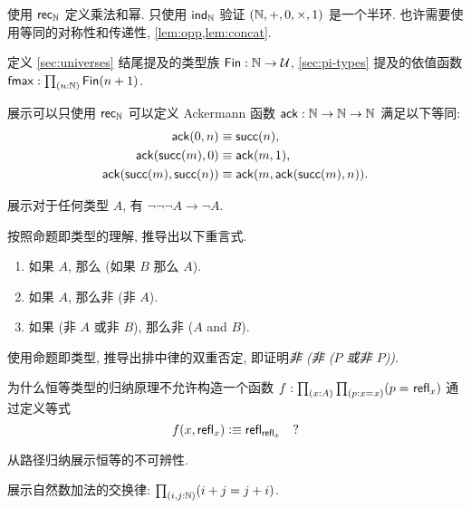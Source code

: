 \begin{ex}
    \label{ex:nat-semiring}
    使用 $\mathsf{rec}_{\mathbb{N}}$ 定义乘法和幂.
    只使用 $\mathsf{ind}_{\mathbb{N}}$ 验证 $(\mathbb{N},+,0,\times,1)$ 是一个半环.
    也许需要使用等同的对称性和传递性, \cref{lem:opp,lem:concat}.
\end{ex}

\begin{ex}
    \label{ex:fin}
    定义 \cref{sec:universes} 结尾提及的类型族 $\mathsf{Fin} : \mathbb{N} \to \mathcal{U}$, \cref{sec:pi-types} 提及的依值函数 $\fmax : \prd{n:\nat} \Fin(n+1)$.
\end{ex}

\begin{ex}
    \label{ex:ackermann}
    展示可以只使用 $\mathsf{rec}_{\mathbb{N}}$ 可以定义 Ackermann 函数 $\mathsf{ack} : \mathbb{N} \to \mathbb{N} \to \mathbb{N}$ 满足以下等同:
    \begin{align*}
        \mathsf{ack}(0,n) &\equiv \mathsf{succ}(n), \\
        \mathsf{ack}(\mathsf{succ}(m),0) &\equiv \mathsf{ack}(m,1), \\
        \mathsf{ack}(\mathsf{succ}(m),\mathsf{succ}(n)) &\equiv \mathsf{ack}(m,\mathsf{ack}(\mathsf{succ}(m),n)).
    \end{align*}
\end{ex}

\begin{ex}
    \label{ex:neg-ldn}
    展示对于任何类型 $A$, 有 $\neg\neg\neg A \to \neg A$.
\end{ex}

\begin{ex}
    \label{ex:tautologies}
    按照命题即类型的理解, 推导出以下重言式.
    \begin{enumerate}
        \item 如果 $A$, 那么 (如果 $B$ 那么 $A$).
        \item 如果 $A$, 那么非 (非 $A$).
        \item 如果 (非 $A$ 或非 $B$), 那么非 ($A$ and $B$).
    \end{enumerate}
\end{ex}

\begin{ex}
    \label{ex:not-not-lem}
    使用命题即类型, 推导出排中律的双重否定, 即证明\emph{非 (非 ($P$ 或非 $P$))}.
\end{ex}

\begin{ex}
    \label{ex:without-K}
    为什么恒等类型的归纳原理不允许构造一个函数 $f: \prd{x:A}{p:\id{x}{x}} (\id{p}{\refl{x}})$ 通过定义等式
    \[ f(x,\mathsf{refl}_{x}) \vcentcolon\equiv \mathsf{refl}_{\mathsf{refl}_{x}} \quad ?\]
\end{ex}

\begin{ex}
    \label{ex:subtFromPathInd}
    从路径归纳展示恒等的不可辨性.
\end{ex}

\begin{ex}
    \label{ex:add-nat-commutative}
    展示自然数加法的交换律: $\prd{i,j:\nat} (i+j=j+i)$.
\end{ex}
